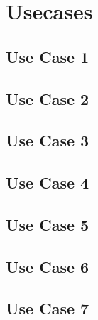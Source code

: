\section{Usecases}

\subsection{Use Case 1}


\subsection{Use Case 2}


\subsection{Use Case 3}


\subsection{Use Case 4}


\subsection{Use Case 5}


\subsection{Use Case 6}


\subsection{Use Case 7}

